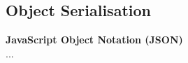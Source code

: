 \documentclass[../report.tex]{subfiles}
\begin{document}



\subsection{Object Serialisation} %










\textbf{JavaScript Object Notation (JSON)} \\

...
\end{document}
